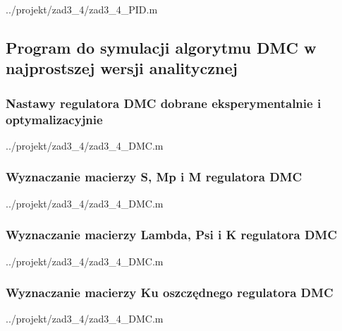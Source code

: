 \ifdefined\CompileListings
    
        {../projekt/zad3_4/zad3_4_PID.m}
\fi
\newpage

\subsection{Program do symulacji algorytmu DMC w najprostszej wersji analitycznej}

\subsubsection{Nastawy regulatora DMC dobrane eksperymentalnie i optymalizacyjnie}

\ifdefined\CompileListings
    
        {../projekt/zad3_4/zad3_4_DMC.m}
\fi

\subsubsection{Wyznaczanie macierzy S, Mp i M regulatora DMC}

\ifdefined\CompileListings
    
        {../projekt/zad3_4/zad3_4_DMC.m}
    \newpage
\fi

\subsubsection{Wyznaczanie macierzy Lambda, Psi i K regulatora DMC}

\ifdefined\CompileListings
    
        {../projekt/zad3_4/zad3_4_DMC.m}
\fi

\subsubsection{Wyznaczanie macierzy Ku oszczędnego regulatora DMC}

\ifdefined\CompileListings
    
        {../projekt/zad3_4/zad3_4_DMC.m}
    \newpage
\fi

